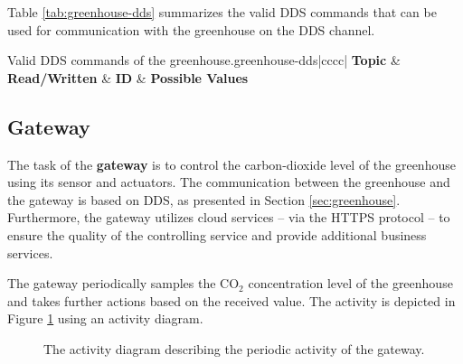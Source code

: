 \documentclass[a4paper, 11pt]{article}
\begin{document}
	Table \ref{tab:greenhouse-dds} summarizes the valid DDS commands that can be used for communication with the greenhouse on the DDS channel.
	
	\begin{mytable}{Valid DDS commands of the greenhouse.}{greenhouse-dds}{|cccc|}
		\hline
		\textbf{Topic} & \textbf{Read/Written} & \textbf{ID} & \textbf{Possible Values} \\ \hline \hline
	\end{mytable}
	
	\subsection{Gateway}
	
	The task of the \textbf{gateway} is to control the carbon-dioxide level of the greenhouse using its sensor and actuators. The communication between the greenhouse and the gateway is based on DDS, as presented in Section \ref{sec:greenhouse}. Furthermore, the gateway utilizes cloud services -- via the HTTPS protocol -- to ensure the quality of the controlling service and provide additional business services.
	
	The gateway periodically samples the CO$_2$ concentration level of the greenhouse and takes further actions based on the received value. The activity is depicted in Figure \ref{fig:activity} using an activity diagram.
		
	\begin{figure}[h!]
		\center
		\caption{The activity diagram describing the periodic activity of the gateway.}
		\label{fig:activity}
	\end{figure}
	
\end{document}
